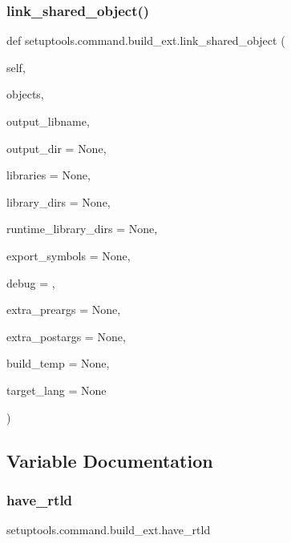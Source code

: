 \subsubsection{\texorpdfstring{link\+\_\+shared\+\_\+object()}{link\_shared\_object()}}
{\footnotesize\ttfamily def setuptools.\+command.\+build\+\_\+ext.\+link\+\_\+shared\+\_\+object (\begin{DoxyParamCaption}\item[{}]{self,  }\item[{}]{objects,  }\item[{}]{output\+\_\+libname,  }\item[{}]{output\+\_\+dir = {\ttfamily None},  }\item[{}]{libraries = {\ttfamily None},  }\item[{}]{library\+\_\+dirs = {\ttfamily None},  }\item[{}]{runtime\+\_\+library\+\_\+dirs = {\ttfamily None},  }\item[{}]{export\+\_\+symbols = {\ttfamily None},  }\item[{}]{debug = {},  }\item[{}]{extra\+\_\+preargs = {\ttfamily None},  }\item[{}]{extra\+\_\+postargs = {\ttfamily None},  }\item[{}]{build\+\_\+temp = {\ttfamily None},  }\item[{}]{target\+\_\+lang = {\ttfamily None} }\end{DoxyParamCaption})}



\subsection{Variable Documentation}
\mbox{\label{namespacesetuptools_1_1command_1_1build__ext_a5ed03ad14d556bf6095784ca350772e7}} 
\subsubsection{\texorpdfstring{have\+\_\+rtld}{have\_rtld}}
{\footnotesize\ttfamily setuptools.\+command.\+build\+\_\+ext.\+have\+\_\+rtld}

